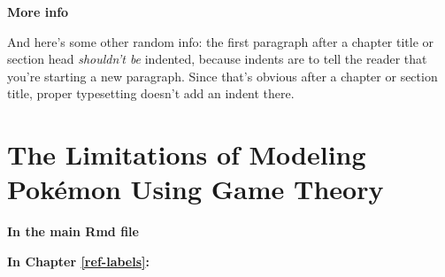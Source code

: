 \documentclass[12pt,twoside]{reedthesis}
\begin{document}
  \textbf{More info}
  
  And here's some other random info: the first paragraph after a chapter
  title or section head \emph{shouldn't be} indented, because indents are
  to tell the reader that you're starting a new paragraph. Since that's
  obvious after a chapter or section title, proper typesetting doesn't add
  an indent there.
  
  \appendix
  
  \chapter{The Limitations of Modeling Pokémon Using Game
  Theory}\label{the-limitations-of-modeling-pokemon-using-game-theory}
  
  \textbf{In the main Rmd file}
  
  \begin{Shaded}
  \begin{Highlighting}[]
    \NormalTok{(}\NormalTok{, } \NormalTok{)}
    \NormalTok{(}\NormalTok{)}
  \end{Highlighting}
  \end{Shaded}
  
  \textbf{In Chapter \ref{ref-labels}:}
  
\end{document}
